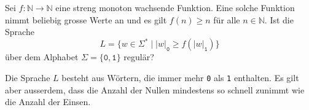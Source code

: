 Sei $f\colon \mathbb{N}\to\mathbb{N}$ eine streng monoton wachsende Funktion.
Eine solche Funktion nimmt beliebig grosse Werte an und es 
gilt $f(n) \ge n$ für alle $n\in\mathbb{N}$.
Ist die Sprache
\[
L=
\{
w\in\Sigma^*
\;|\;
|w|_{\texttt{0}}
\ge f(|w|_{\texttt{1}})
\}
\]
über dem Alphabet $\Sigma=\{\texttt{0},\texttt{1}\}$ regulär?

\begin{hinweis}
Die Sprache $L$ besteht aus Wörtern, die immer mehr \texttt{0} als \texttt{1}
enthalten.
Es gilt aber ausserdem, dass die Anzahl der Nullen mindestens so schnell
zunimmt wie die Anzahl der Einsen.
\end{hinweis}


